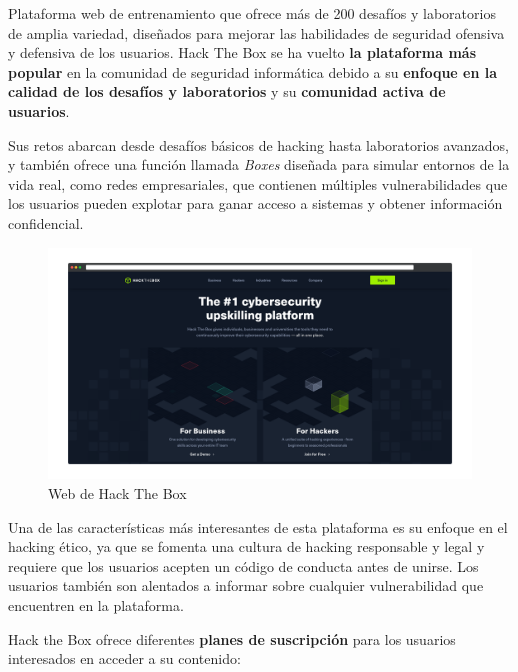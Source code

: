         Plataforma web de entrenamiento que ofrece más de 200 desafíos y laboratorios de amplia variedad, diseñados para mejorar las habilidades de seguridad ofensiva y defensiva de los usuarios. Hack The Box se ha vuelto \textbf{la plataforma más popular} en la comunidad de seguridad informática debido a su \textbf{enfoque en la calidad de los desafíos y laboratorios} y su \textbf{comunidad activa de usuarios}.
        
        Sus retos abarcan desde desafíos básicos de hacking hasta laboratorios avanzados, y también ofrece una función llamada \textit{Boxes} diseñada para simular entornos de la vida real, como redes empresariales, que contienen múltiples vulnerabilidades que los usuarios pueden explotar para ganar acceso a sistemas y obtener información confidencial.
        
        \begin{figure}[h]
            \centering

            \includegraphics[width=\textwidth]{images/Capturas/Web de HTB.png}

            \caption{Web de Hack The Box}
            \label{fig:HTB-web}
        \end{figure}
        
        Una de las características más interesantes de esta plataforma es su enfoque en el hacking ético, ya que se fomenta una cultura de hacking responsable y legal y requiere que los usuarios acepten un código de conducta antes de unirse. Los usuarios también son alentados a informar sobre cualquier vulnerabilidad que encuentren en la plataforma.
        
        Hack the Box ofrece diferentes \textbf{planes de suscripción} para los usuarios interesados en acceder a su contenido:
        
